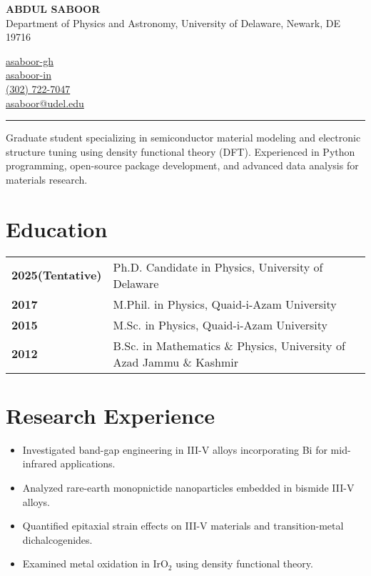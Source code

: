 \documentclass[letter,11pt]{article}
\begin{document}
\begin{minipage}{0.5\textwidth}
    \raggedright
    {\Large \textbf{ABDUL SABOOR}} \\ Department of Physics and Astronomy, University of Delaware, Newark, DE 19716 
\end{minipage}
\hfill
\begin{minipage}{0.3\textwidth}
    \raggedright
    \faGithub \quad \href{https://github.com/asaboor-gh}{asaboor-gh}\\
    \faLinkedin \quad \href{https://linkedin.com/in/asaboor-in}{asaboor-in} \\
    \faPhone \quad \href{tel:+13027227047}{(302) 722-7047} \\
    \faEnvelope \quad \href{mailto:asaboor@udel.edu}{asaboor@udel.edu}
\end{minipage}
\vspace{2mm}
\hrule
\vspace{5mm} \noindent Graduate student specializing in semiconductor material modeling and electronic structure tuning using density functional theory (DFT). Experienced in Python programming, open-source package development, and advanced data analysis for materials research.

\section{Education}
\begin{tabular}{p{3cm} p{12cm}}
    \textbf{2025(Tentative)} & Ph.D. Candidate in Physics, University of Delaware \\
    \textbf{2017} & M.Phil. in Physics, Quaid-i-Azam University \\
    \textbf{2015} & M.Sc. in Physics, Quaid-i-Azam University \\
    \textbf{2012} & B.Sc. in Mathematics \& Physics, University of Azad Jammu \& Kashmir \\
\end{tabular}

\section{Research Experience}

\begin{itemize}
\item Investigated band-gap engineering in III-V alloys incorporating Bi for mid-infrared applications.
\item Analyzed rare-earth monopnictide nanoparticles embedded in bismide III-V alloys.

\item Quantified epitaxial strain effects on III-V materials and transition-metal dichalcogenides.
\item Examined metal oxidation in IrO$_2$ using density functional theory.
\end{itemize}
\end{document}
